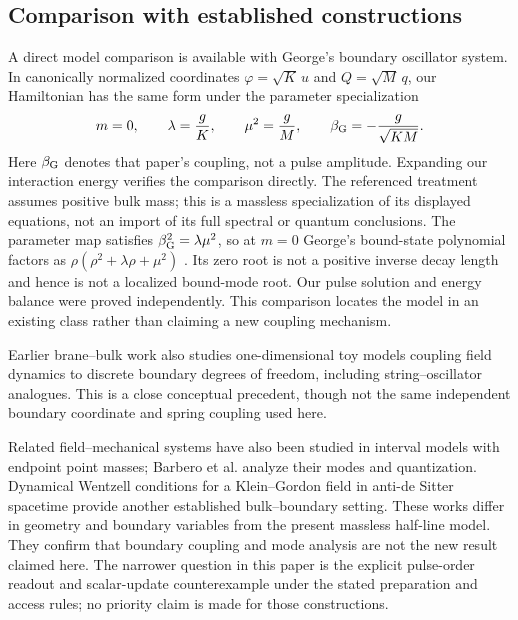 \documentclass[11pt,a4paper]{article}
\theoremstyle{remark}
\begin{document}
\subsection{Comparison with established constructions}

A direct model comparison is available with George's boundary oscillator
system\cite[Section 2.1, Eqs.~(14), (19)--(21)]{george}. In canonically
normalized coordinates $\varphi=\sqrt K\,u$ and $Q=\sqrt M\,q$, our
Hamiltonian has the same form under the parameter specialization
\begin{equation}
 m=0,\qquad \lambda=\frac gK,\qquad
 \mu^2=\frac gM,\qquad \beta_{\rm G}=-\frac g{\sqrt{KM}}.
 \label{eq:george-map}
\end{equation}
Here $\beta_{\rm G}$ denotes that paper's coupling, not a pulse amplitude.
Expanding our interaction energy verifies the comparison directly.
The referenced treatment assumes positive bulk mass; this is a massless
specialization of its displayed equations, not an import of its full
spectral or quantum conclusions. The parameter map satisfies
$\beta_{\rm G}^2=\lambda\mu^2$, so at $m=0$ George's bound-state
polynomial factors as $\rho(\rho^2+\lambda\rho+\mu^2)$
\cite[Section~2.2]{george}. Its zero root
is not a positive inverse decay length and hence is not a localized
bound-mode root. Our pulse solution and energy balance were proved
independently. This comparison locates the model in an existing class
rather than claiming a new coupling mechanism.

Earlier brane--bulk work also studies one-dimensional toy models coupling
field dynamics to discrete boundary degrees of freedom, including
string--oscillator analogues\cite{binetruy}. This is a close conceptual
precedent, though not the same independent boundary coordinate and spring
coupling used here.

Related field--mechanical systems have also been studied in interval
models with endpoint point masses; Barbero et al. analyze their modes
and quantization\cite{barbero}. Dynamical Wentzell conditions for a
Klein--Gordon field in anti-de Sitter spacetime provide another established
bulk--boundary setting\cite{dappiaggi}. These works differ in geometry
and boundary variables from the present massless half-line model. They
confirm that boundary coupling and mode analysis are not the new result
claimed here. The narrower question in this paper is the explicit
pulse-order readout and scalar-update counterexample under the stated
preparation and access rules; no priority claim is made for those
constructions.
\end{document}
